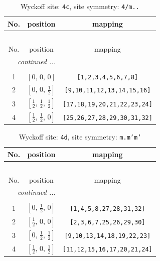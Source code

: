\documentclass[fleqn,8pt]{jsarticle}
\begin{document}
\renewcommand{\arraystretch}{1.2}
\begin{longtable}{ccc}
\caption{Wyckoff site: {\tt 4c}, site symmetry: {\tt 4/m..}}
 \\
 \hline \hline
No. & position & mapping \\ \hline \endfirsthead

\multicolumn{2}{l}{\tablename\ \thetable{}} \\
 \hline \hline
No. & position & mapping \\ \hline \endhead

 \hline \hline
\multicolumn{2}{r}{\footnotesize\it continued ...} \\ \endfoot

 \hline \hline
\multicolumn{2}{r}{} \\ \endlastfoot

1 & $\left[ 0,\, 0,\, 0 \right]$ & {\tt [1,2,3,4,5,6,7,8]} \\ \hline
2 & $\left[ 0,\, 0,\, \frac{1}{2} \right]$ & {\tt [9,10,11,12,13,14,15,16]} \\ \hline
3 & $\left[ \frac{1}{2},\, \frac{1}{2},\, \frac{1}{2} \right]$ & {\tt [17,18,19,20,21,22,23,24]} \\ \hline
4 & $\left[ \frac{1}{2},\, \frac{1}{2},\, 0 \right]$ & {\tt [25,26,27,28,29,30,31,32]} \\
\end{longtable}
\renewcommand{\arraystretch}{1.2}
\begin{longtable}{ccc}
\caption{Wyckoff site: {\tt 4d}, site symmetry: {\tt m.m'm'}}
 \\
 \hline \hline
No. & position & mapping \\ \hline \endfirsthead

\multicolumn{2}{l}{\tablename\ \thetable{}} \\
 \hline \hline
No. & position & mapping \\ \hline \endhead

 \hline \hline
\multicolumn{2}{r}{\footnotesize\it continued ...} \\ \endfoot

 \hline \hline
\multicolumn{2}{r}{} \\ \endlastfoot

1 & $\left[ 0,\, \frac{1}{2},\, 0 \right]$ & {\tt [1,4,5,8,27,28,31,32]} \\ \hline
2 & $\left[ \frac{1}{2},\, 0,\, 0 \right]$ & {\tt [2,3,6,7,25,26,29,30]} \\ \hline
3 & $\left[ 0,\, \frac{1}{2},\, \frac{1}{2} \right]$ & {\tt [9,10,13,14,18,19,22,23]} \\ \hline
4 & $\left[ \frac{1}{2},\, 0,\, \frac{1}{2} \right]$ & {\tt [11,12,15,16,17,20,21,24]} \\
\end{longtable}
\end{document}
